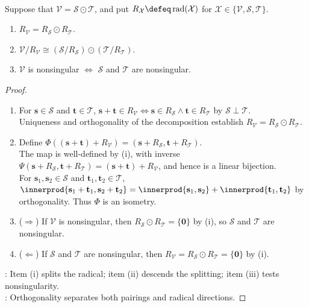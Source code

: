 \begin{proposition} \label{prop:orthogonal-sums-radicals-and-regular-quotients} \\
Suppose that $\mathcal{V}=\mathcal{S}\odot\mathcal{T}$, and put $R_{\mathcal{X}}\defeq\operatorname{rad}(\mathcal{X})$ for $\mathcal{X}\in\{\mathcal{V},\mathcal{S},\mathcal{T}\}$.
\begin{enumerate}[label=(\roman*)]
\setlength{\itemsep}{0pt}
\item $R_{\mathcal{V}}=R_{\mathcal{S}}\odot R_{\mathcal{T}}$.
\item $\mathcal{V}/R_{\mathcal{V}}\cong(\mathcal{S}/R_{\mathcal{S}})\odot(\mathcal{T}/R_{\mathcal{T}})$.
\item $\mathcal{V}$ is nonsingular $\Longleftrightarrow$ $\mathcal{S}$ and $\mathcal{T}$ are nonsingular.
\end{enumerate}
\begin{proof}
\begin{enumerate}[label=(\roman*)]
\setlength{\itemsep}{0pt}
\item[$(i)$] For $\mathbf{s}\in\mathcal{S}$ and $\mathbf{t}\in\mathcal{T}$, $\mathbf{s}+\mathbf{t}\in R_{\mathcal{V}}\Longleftrightarrow\mathbf{s}\in R_{\mathcal{S}}\wedge\mathbf{t}\in R_{\mathcal{T}}$ by $\mathcal{S}\perp\mathcal{T}$.\\
Uniqueness and orthogonality of the decomposition establish $R_{\mathcal{V}}=R_{\mathcal{S}}\odot R_{\mathcal{T}}$.
\item[$(ii)$] Define $\Phi((\mathbf{s}+\mathbf{t})+R_{\mathcal{V}})=(\mathbf{s}+R_{\mathcal{S}},\mathbf{t}+R_{\mathcal{T}})$.\\
The map is well-defined by (i), with inverse $\Psi(\mathbf{s}+R_{\mathcal{S}},\mathbf{t}+R_{\mathcal{T}})=(\mathbf{s}+\mathbf{t})+R_{\mathcal{V}}$, and hence is a linear bijection.\\
For $\mathbf{s}_1,\mathbf{s}_2\in\mathcal{S}$ and $\mathbf{t}_1,\mathbf{t}_2\in\mathcal{T}$, $\innerprod{\mathbf{s}_1+\mathbf{t}_1,\mathbf{s}_2+\mathbf{t}_2}=\innerprod{\mathbf{s}_1,\mathbf{s}_2}+\innerprod{\mathbf{t}_1,\mathbf{t}_2}$ by orthogonality. Thus $\Phi$ is an isometry.
\item[$(iii)$] ($\Rightarrow$) If $\mathcal{V}$ is nonsingular, then $R_{\mathcal{S}}\odot R_{\mathcal{T}}=\{\mathbf{0}\}$ by (i), so $\mathcal{S}$ and $\mathcal{T}$ are nonsingular.
\item[$(iii)$] ($\Leftarrow$) If $\mathcal{S}$ and $\mathcal{T}$ are nonsingular, then $R_{\mathcal{V}}=R_{\mathcal{S}}\odot R_{\mathcal{T}}=\{\mathbf{0}\}$ by (i).
\end{enumerate}
: Item (i) splits the radical; item (ii) descends the splitting; item (iii) tests nonsingularity.\\
: Orthogonality separates both pairings and radical directions.
\end{proof}
\end{proposition}

